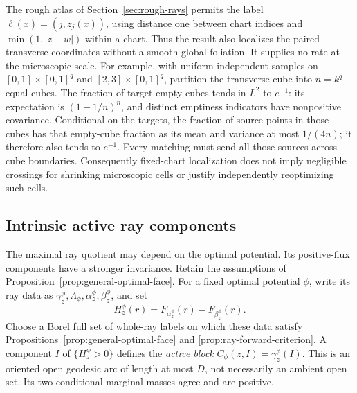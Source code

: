 \documentclass[11pt,reqno]{amsart}
\theoremstyle{definition}
\theoremstyle{remark}
\numberwithin{equation}{section}
\begin{document}
The rough atlas of Section~\ref{sec:rough-rays} permits the label
\(\ell(x)=(j,z_j(x))\), using distance one between chart indices
and \(\min(1,|z-w|)\) within a chart. Thus the result also
localizes the paired transverse coordinates without a smooth global
foliation. It supplies no rate at the microscopic scale. For example,
with uniform independent samples on
\([0,1]\times[0,1]^q\) and \([2,3]\times[0,1]^q\), partition the
transverse cube into \(n=k^q\) equal cubes. The fraction of target-empty
cubes tends in \(L^2\) to \(e^{-1}\): its expectation is
\((1-1/n)^n\), and distinct emptiness indicators have nonpositive
covariance. Conditional on the targets, the fraction of source points
in those cubes has that empty-cube fraction as its mean and variance
at most \(1/(4n)\); it therefore also tends to \(e^{-1}\).
Every matching must send all those
sources across cube boundaries. Consequently fixed-chart localization
does not imply negligible crossings for shrinking microscopic cells
or justify independently reoptimizing such cells.


\subsection{Intrinsic active ray components}
\label{subsec:intrinsic-active-components}

The maximal ray quotient may depend on the optimal potential. Its
positive-flux components have a stronger invariance. Retain the
assumptions of Proposition~\ref{prop:general-optimal-face}. For a fixed
optimal potential \(\phi\), write its ray data as
\(\gamma_z^\phi,\Lambda_\phi,\alpha_z^\phi,\beta_z^\phi\), and set
\[
 H_z^\phi(r)=F_{\alpha_z^\phi}(r)-F_{\beta_z^\phi}(r).
\]
Choose a Borel full set of whole-ray labels on which these data satisfy
Propositions~\ref{prop:general-optimal-face} and
\ref{prop:ray-forward-criterion}. A component \(I\) of
\(\{H_z^\phi>0\}\) defines the \emph{active block}
\(C_\phi(z,I)=\gamma_z^\phi(I)\). This is an oriented open geodesic
arc of length at most \(D\), not necessarily an ambient open set.
Its two conditional marginal masses agree and are positive.
\end{document}
